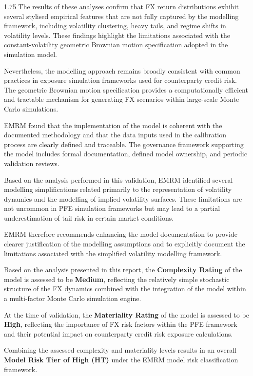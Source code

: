 \begin{spacing}{1.75}
	The results of these analyses confirm that FX return distributions exhibit several stylised empirical features that are not fully captured by the modelling framework, including volatility clustering, heavy tails, and regime shifts in volatility levels. These findings highlight the limitations associated with the constant-volatility geometric Brownian motion specification adopted in the simulation model.
	
	Nevertheless, the modelling approach remains broadly consistent with common practices in exposure simulation frameworks used for counterparty credit risk. The geometric Brownian motion specification provides a computationally efficient and tractable mechanism for generating FX scenarios within large-scale Monte Carlo simulations.
	
	EMRM found that the implementation of the model is coherent with the documented methodology and that the data inputs used in the calibration process are clearly defined and traceable. The governance framework supporting the model includes formal documentation, defined model ownership, and periodic validation reviews.
	
	Based on the analysis performed in this validation, EMRM identified several modelling simplifications related primarily to the representation of volatility dynamics and the modelling of implied volatility surfaces. These limitations are not uncommon in PFE simulation frameworks but may lead to a partial underestimation of tail risk in certain market conditions.
	
	EMRM therefore recommends enhancing the model documentation to provide clearer justification of the modelling assumptions and to explicitly document the limitations associated with the simplified volatility modelling framework.
	
	Based on the analysis presented in this report, the \textbf{Complexity Rating} of the model is assessed to be \textbf{Medium}, reflecting the relatively simple stochastic structure of the FX dynamics combined with the integration of the model within a multi-factor Monte Carlo simulation engine.
	
	At the time of validation, the \textbf{Materiality Rating} of the model is assessed to be \textbf{High}, reflecting the importance of FX risk factors within the PFE framework and their potential impact on counterparty credit risk exposure calculations.
	
	Combining the assessed complexity and materiality levels results in an overall \textbf{Model Risk Tier of High (HT)} under the EMRM model risk classification framework.
	
\end{spacing}
\clearpage
